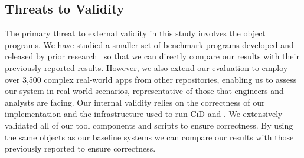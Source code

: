  
\subsection{Threats to Validity}

The primary threat to external validity in this study
involves the object programs. We have studied a smaller set of benchmark programs
developed and released by prior research~\cite{lili2018cid,huang2018understanding} so that
we can directly compare our results with their
previously reported results.  However, we also extend
our evaluation to employ over 3,500 complex real-world apps from
other repositories, enabling us to assess our system in
real-world scenarios, representative of those that
engineers and analysts are facing.
Our internal validity relies on the correctness of our implementation
and the infrastructure used to run \textsc{CiD} and
\@approach.  We extensively validated
all of our tool components and scripts to ensure
correctness.  By using the same objects as our baseline
systems we can compare our results with those previously reported to ensure correctness.
\begin{comment}
The primary threat to construct validity relates to the
fact that we study efficiency measures relative to
applications of \@approach, but do not yet assess
whether the approach helps software engineers or
analysts addresses dependability and security concerns
more quickly than current approaches.
\end{comment}
